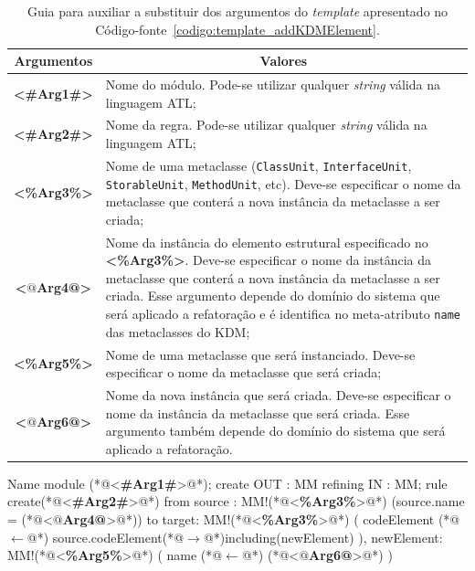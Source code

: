 \begin{table}
\centering
\caption{Guia para auxiliar a substituir dos argumentos do \textit{template} apresentado no Código-fonte~\ref{codigo:template_addKDMElement}.}
\label{tab:guia_template_operacao_add}
\begin{tabular}{ | m{1.7cm} | m{12cm}| } 
\hline
\multicolumn{1}{|c|}{Argumentos}                                         & \multicolumn{1}{c|}{Valores} \\ \hline
\multicolumn{1}{|c|}{\textbf{<\#Arg1\#>}} & Nome do módulo. Pode-se utilizar qualquer \textit{string} válida na linguagem ATL; \\ 
\hline
\multicolumn{1}{|c|}{\textbf{<\#Arg2\#>}} & Nome da regra. Pode-se utilizar qualquer \textit{string} válida na linguagem ATL; \\  
\hline
\multicolumn{1}{|c|}{\textbf{<\%Arg3\%>}} & Nome de uma metaclasse (\texttt{ClassUnit}, \texttt{InterfaceUnit}, \texttt{StorableUnit}, \texttt{MethodUnit}, etc). Deve-se especificar o nome da metaclasse que conterá a nova instância da metaclasse a ser criada; \\ 
\hline
\multicolumn{1}{|c|}{\textbf{<$@$Arg4@>}} & Nome da instância do elemento estrutural especificado no \textbf{<\%Arg3\%>}. Deve-se especificar o nome da instância da metaclasse que conterá a nova instância da metaclasse a ser criada. Esse argumento depende do domínio do sistema que será aplicado a refatoração e é identifica no meta-atributo \texttt{name} das metaclasses do KDM;  \\ 
\hline
\multicolumn{1}{|c|}{\textbf{<\%Arg5\%>}} & Nome de uma metaclasse que será instanciado. Deve-se especificar o nome da metaclasse que será criada;  \\ 
\hline
\multicolumn{1}{|c|}{\textbf{<$@$Arg6@>}} & Nome da nova instância que será criada. Deve-se especificar o nome da instância da metaclasse que será criada. Esse argumento também depende do domínio do sistema que será aplicado a refatoração.  \\ 
\hline
\end{tabular}
\end{table}


\begin{codigo}[caption={[\textit{Template} ATL para realizar a operação atômica \texttt{add}.] \textit{Template} ATL para realizar a operação atômica \texttt{add}.},escapeinside={(*@}{@*)}, basicstyle=\footnotesize, label={codigo:template_addKDMElement}, language=ATL]{Name}
module (*@<\textbf{\#Arg1\#}>@*);
create OUT : MM refining IN : MM;
rule create(*@<\textbf{\#Arg2\#}>@*){
	from
		source : MM!(*@<\textbf{\%Arg3\%}>@*) (source.name = (*@<\textbf{$@$Arg4@}>@*))
	to 
		target: MM!(*@<\textbf{\%Arg3\%}>@*) (
			codeElement (*@$\leftarrow$@*) source.codeElement(*@$\rightarrow$@*)including(newElement)
		),
		newElement: MM!(*@<\textbf{\%Arg5\%}>@*) (
			name (*@$\leftarrow$@*) (*@<\textbf{$@$Arg6@}>@*)
		)
}
\end{codigo}


